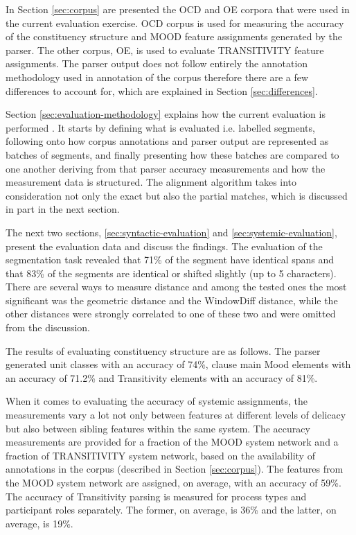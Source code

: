     In Section \ref{sec:corpus} are presented the OCD and OE corpora that were used in the current evaluation exercise. OCD corpus is used for measuring the accuracy of the constituency structure and MOOD feature assignments generated by the parser. The other corpus, OE, is used to evaluate TRANSITIVITY feature assignments. The parser output does not follow entirely the annotation methodology used in annotation of the corpus therefore there are a few differences to account for, which are explained in Section \ref{sec:differences}. 
    
    Section \ref{sec:evaluation-methodology} explains how the current evaluation is performed . It starts by defining what is evaluated i.e. labelled segments, following onto how corpus annotations and parser output are represented as batches of segments, and finally presenting how these batches are compared to one another deriving from that parser accuracy measurements and how the measurement data is structured. The alignment algorithm takes into consideration not only the exact but also the partial matches, which is discussed in part in the next section. 
    
    The next two sections, \ref{sec:syntactic-evaluation} and \ref{sec:systemic-evaluation}, present the evaluation data and discuss the findings. The evaluation of the segmentation task revealed that 71\% of the segment have identical spans and that 83\% of the segments are identical or shifted slightly (up to 5 characters). There are several ways to measure distance and among the tested ones the most significant was the geometric distance and the WindowDiff distance, while the other distances were strongly correlated to one of these two and were omitted from the discussion. 
    
    The results of evaluating constituency structure are as follows. The parser generated unit classes with an accuracy of 74\%, clause main Mood elements with an accuracy of 71.2\% and Transitivity elements with an accuracy of 81\%. 
    
    When it comes to evaluating the accuracy of systemic assignments, the measurements vary a lot not only between features at different levels of delicacy but also between sibling features within the same system. The accuracy measurements are provided for a fraction of the MOOD system network and a fraction of TRANSITIVITY system network, based on the availability of annotations in the corpus (described in Section \ref{sec:corpus}). The features from the MOOD system network are assigned, on average, with an accuracy of 59\%. The accuracy of Transitivity parsing is measured for process types and participant roles separately. The former, on average, is 36\% and the latter, on average, is 19\%. 
    
